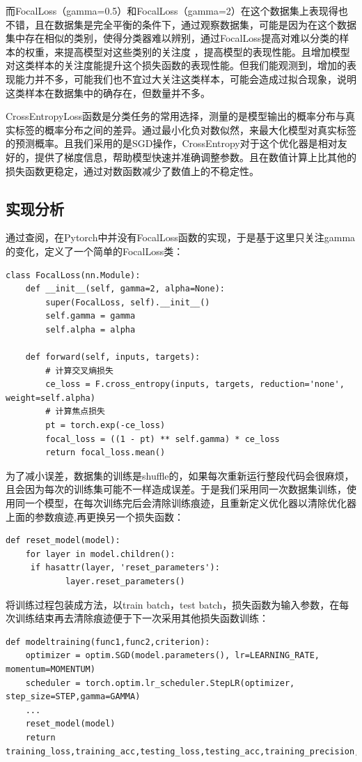 \documentclass{article}
\begin{document}
而FocalLoss（gamma=0.5）和FocalLoss（gamma=2）在这个数据集上表现得也不错，且在数据集是完全平衡的条件下，通过观察数据集，可能是因为在这个数据集中存在相似的类别，使得分类器难以辨别，通过FocalLoss提高对难以分类的样本的权重，来提高模型对这些类别的关注度 ，提高模型的表现性能。且增加模型对这类样本的关注度能提升这个损失函数的表现性能。但我们能观测到，增加的表现能力并不多，可能我们也不宜过大关注这类样本，可能会造成过拟合现象，说明这类样本在数据集中的确存在，但数量并不多。

CrossEntropyLoss函数是分类任务的常用选择，测量的是模型输出的概率分布与真实标签的概率分布之间的差异。通过最小化负对数似然，来最大化模型对真实标签的预测概率。且我们采用的是SGD操作，CrossEntropy对于这个优化器是相对友好的，提供了梯度信息，帮助模型快速并准确调整参数。且在数值计算上比其他的损失函数更稳定，通过对数函数减少了数值上的不稳定性。

\subsection{实现分析}
通过查阅，在Pytorch中并没有FocalLoss函数的实现，于是基于这里只关注gamma的变化，定义了一个简单的FocalLoss类：
\begin{lstlisting}
class FocalLoss(nn.Module):
    def __init__(self, gamma=2, alpha=None):
        super(FocalLoss, self).__init__()
        self.gamma = gamma
        self.alpha = alpha

    def forward(self, inputs, targets):
        # 计算交叉熵损失
        ce_loss = F.cross_entropy(inputs, targets, reduction='none', weight=self.alpha)
        # 计算焦点损失
        pt = torch.exp(-ce_loss)
        focal_loss = ((1 - pt) ** self.gamma) * ce_loss
        return focal_loss.mean()
\end{lstlisting}

为了减小误差，数据集的训练是shuffle的，如果每次重新运行整段代码会很麻烦，且会因为每次的训练集可能不一样造成误差。于是我们采用同一次数据集训练，使用同一个模型，在每次训练完后会清除训练痕迹，且重新定义优化器以清除优化器上面的参数痕迹,再更换另一个损失函数：
\begin{lstlisting}
def reset_model(model):
    for layer in model.children():
     if hasattr(layer, 'reset_parameters'):
            layer.reset_parameters()
\end{lstlisting}

将训练过程包装成方法，以train batch，test batch，损失函数为输入参数，在每次训练结束再去清除痕迹便于下一次采用其他损失函数训练：
\begin{lstlisting}
def modeltraining(func1,func2,criterion):
    optimizer = optim.SGD(model.parameters(), lr=LEARNING_RATE, momentum=MOMENTUM)
    scheduler = torch.optim.lr_scheduler.StepLR(optimizer, step_size=STEP,gamma=GAMMA)
    ...
    reset_model(model)
    return training_loss,training_acc,testing_loss,testing_acc,training_precision,training_recall,training_f1,testing_precision,testing_recall,testing_f1
\end{lstlisting}
\end{document}
